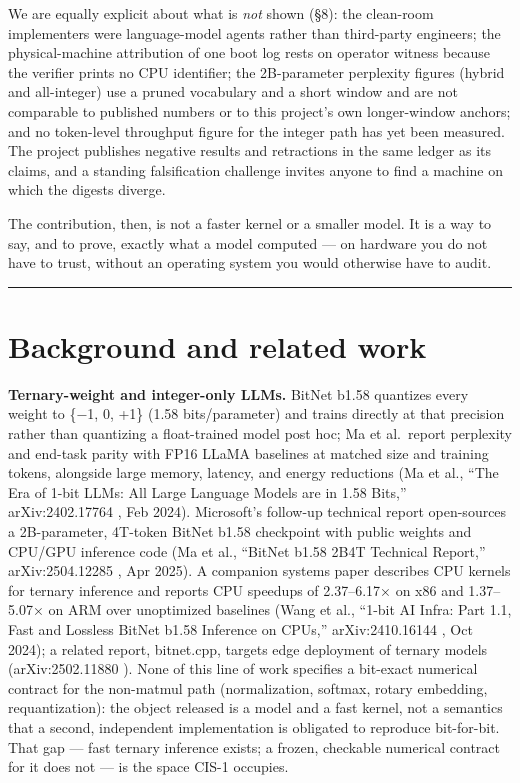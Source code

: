 \documentclass[11pt]{article}
\begin{document}
We are equally explicit about what is \emph{not} shown (§8): the clean-room implementers were
language-model agents rather than third-party engineers; the physical-machine attribution of one
boot log rests on operator witness because the verifier prints no CPU identifier; the
2B-parameter perplexity figures (hybrid and all-integer) use a pruned vocabulary and a short
window and are not comparable to published numbers or to this project's own longer-window
anchors; and no token-level throughput figure for the integer path has yet been
measured. The project publishes negative results and retractions in the same ledger as its
claims, and a standing falsification challenge invites anyone to find a machine on which the
digests diverge.

The contribution, then, is not a faster kernel or a smaller model. It is a way to say, and to
prove, exactly what a model computed --- on hardware you do not have to trust, without an operating
system you would otherwise have to audit.

\begin{center}\rule{0.5\linewidth}{0.5pt}\end{center}

\section{Background and related work}\label{background-and-related-work}

\textbf{Ternary-weight and integer-only LLMs.} BitNet b1.58 quantizes every weight
to \{−1, 0, +1\} (1.58 bits/parameter) and trains directly at that precision
rather than quantizing a float-trained model post hoc; Ma et al.~report
perplexity and end-task parity with FP16 LLaMA baselines at matched size and
training tokens, alongside large memory, latency, and energy reductions
(Ma et al., ``The Era of 1-bit LLMs: All Large Language Models are in 1.58
Bits,'' arXiv:2402.17764 \citep{ma2024bitnet158}, Feb 2024). Microsoft's follow-up technical report
open-sources a 2B-parameter, 4T-token BitNet b1.58 checkpoint with public
weights and CPU/GPU inference code (Ma et al., ``BitNet b1.58 2B4T Technical
Report,'' arXiv:2504.12285 \citep{ma2025bitnet2b4t}, Apr 2025). A companion systems paper describes
CPU kernels for ternary inference and reports CPU speedups of 2.37--6.17×
on x86 and 1.37--5.07× on ARM over unoptimized baselines (Wang et al.,
``1-bit AI Infra: Part 1.1, Fast and Lossless BitNet b1.58 Inference on
CPUs,'' arXiv:2410.16144 \citep{wang2024onebitinfra}, Oct 2024); a related report, bitnet.cpp, targets
edge deployment of ternary models (arXiv:2502.11880 \citep{bitnetcpp2025}). None of this line of
work specifies a bit-exact numerical contract for the non-matmul path
(normalization, softmax, rotary embedding, requantization): the object
released is a model and a fast kernel, not a semantics that a second,
independent implementation is obligated to reproduce bit-for-bit. That gap
--- fast ternary inference exists; a frozen, checkable numerical contract for
it does not --- is the space CIS-1 occupies.
\end{document}
